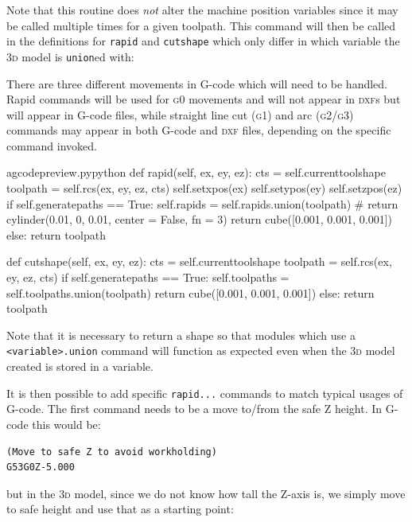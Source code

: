 \documentclass{ltxdoc}
\begin{document}
\noindent Note that this routine does \emph{not} alter the machine position variables since it may be called multiple times for a given toolpath. This command will then be called in the definitions for \verb|rapid| and \verb|cutshape| which only differ in which variable the \textsc{3d} model is \verb|union|ed with:

There are three different movements in G-code which will need to be handled. Rapid commands will be used for \textsc{g0} movements and will not appear in \textsc{dxf}s but will appear in G-code files, while straight line cut (\textsc{g1}) and arc (\textsc{g2/g3}) commands may appear in both G-code and \textsc{dxf} files, depending on the specific command invoked. 

\lstset{firstnumber=\thegcpy}
\begin{writecode}{a}{gcodepreview.py}{python}
    def rapid(self, ex, ey, ez):
        cts = self.currenttoolshape
        toolpath = self.rcs(ex, ey, ez, cts)
        self.setxpos(ex)
        self.setypos(ey)
        self.setzpos(ez)
        if self.generatepaths == True:
            self.rapids = self.rapids.union(toolpath)
#            return cylinder(0.01, 0, 0.01, center = False, fn = 3)
            return cube([0.001, 0.001, 0.001])
        else:
            return toolpath

    def cutshape(self, ex, ey, ez):
        cts = self.currenttoolshape
        toolpath = self.rcs(ex, ey, ez, cts)
        if self.generatepaths == True:
            self.toolpaths = self.toolpaths.union(toolpath)
            return cube([0.001, 0.001, 0.001])
        else:
            return toolpath

\end{writecode}
\addtocounter{gcpy}{22}

Note that it is necessary to return a shape so that modules which use a \verb|<variable>.union| command will function as expected even when the \textsc{3d} model created is stored in a variable.

It is then possible to add specific \verb|rapid...| commands to match typical usages of G-code. The first command needs to be a move to/from the safe Z height. In G-code this would be:

\begin{verbatim}
(Move to safe Z to avoid workholding)
G53G0Z-5.000
\end{verbatim}

\noindent but in the \textsc{3d} model, since we do not know how tall the Z-axis is, we simply move to safe height and use that as a starting point:
\end{document}
